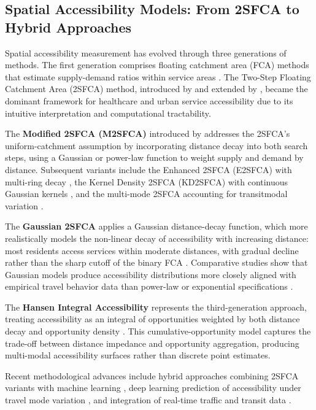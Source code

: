 \documentclass[preprint,12pt,authoryear]{elsarticle}
\begin{document}
\subsection{Spatial Accessibility Models: From 2SFCA to Hybrid Approaches}
\label{sec:2sfca_review}

Spatial accessibility measurement has evolved through three generations of methods. The first generation comprises floating catchment area (FCA) methods that estimate supply-demand ratios within service areas \citep{hansen1959accessibility, luo2003modifying}. The Two-Step Floating Catchment Area (2SFCA) method, introduced by \citet{luo2004using} and extended by \citet{luo2011extending}, became the dominant framework for healthcare and urban service accessibility due to its intuitive interpretation and computational tractability.

The \textbf{Modified 2SFCA (M2SFCA)} introduced by \citet{dai2010spatial} addresses the 2SFCA's uniform-catchment assumption by incorporating distance decay into both search steps, using a Gaussian or power-law function to weight supply and demand by distance. Subsequent variants include the Enhanced 2SFCA (E2SFCA) with multi-ring decay \citep{wang2012measuring}, the Kernel Density 2SFCA (KD2SFCA) with continuous Gaussian kernels \citep{liu2013new}, and the multi-mode 2SFCA accounting for transitmodal variation \citep{farooq2021quick}.

The \textbf{Gaussian 2SFCA} applies a Gaussian distance-decay function, which more realistically models the non-linear decay of accessibility with increasing distance: most residents access services within moderate distances, with gradual decline rather than the sharp cutoff of the binary FCA \citep{comber2008using}. Comparative studies show that Gaussian models produce accessibility distributions more closely aligned with empirical travel behavior data than power-law or exponential specifications \citep{sinelli2019does}.

The \textbf{Hansen Integral Accessibility} represents the third-generation approach, treating accessibility as an integral of opportunities weighted by both distance decay and opportunity density \citep{hansen1959accessibility, barthelemy2016structure}. This cumulative-opportunity model captures the trade-off between distance impedance and opportunity aggregation, producing multi-modal accessibility surfaces rather than discrete point estimates.

Recent methodological advances include hybrid approaches combining 2SFCA variants with machine learning \citep{owen2020multi}, deep learning prediction of accessibility under travel mode variation \citep{zhang2022deep}, and integration of real-time traffic and transit data \citep{yang2023accessibility}.
\end{document}
